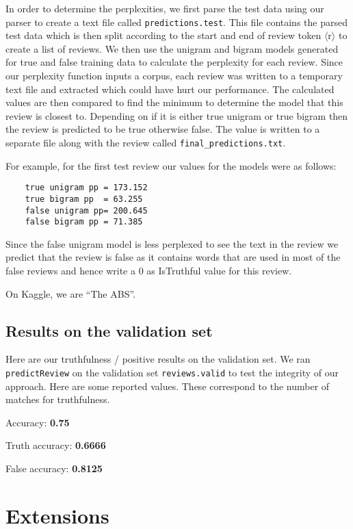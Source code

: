 \documentclass{article}
\begin{document}
In order to determine the perplexities, we first parse the test data using our parser to create a text file called \texttt{predictions.test}. This file contains the parsed test data which is then split according to the start and end of review token $\langle$r$\rangle$ to create a list of reviews. We then use the unigram and bigram models generated for true and false training data to calculate the perplexity for each review. Since our perplexity function inputs a corpus, each review was written to a temporary text file and extracted which could have hurt our performance. The calculated values are then compared to find the minimum to determine the model that this review is closest to. Depending on if it is either true unigram or true bigram then the review is predicted to be true otherwise false. The value is written to a separate file along with the review called \texttt{final\_predictions.txt}.\par

For example, for the first test review our values for the models were as follows:
{\small\begin{verbatim}
    true unigram pp = 173.152
    true bigram pp  = 63.255
    false unigram pp= 200.645
    false bigram pp = 71.385
\end{verbatim}}

Since the false unigram model is less perplexed to see the text in the review we predict that the review is false as it contains words that are used in most of the false reviews and hence write a 0 as IsTruthful value for this review.

On Kaggle, we are ``The ABS''.

\subsection{Results on the validation set}
Here are our truthfulness / positive results on the validation set. We ran \texttt{predictReview} on the validation set \texttt{reviews.valid} to test the integrity of our approach. Here are some reported values. These correspond to the number of matches for truthfulness.

Accuracy: \textbf{0.75}\par
Truth accuracy: \textbf{0.6666}\par
False accuracy: \textbf{0.8125}

\section{Extensions}
\end{document}
